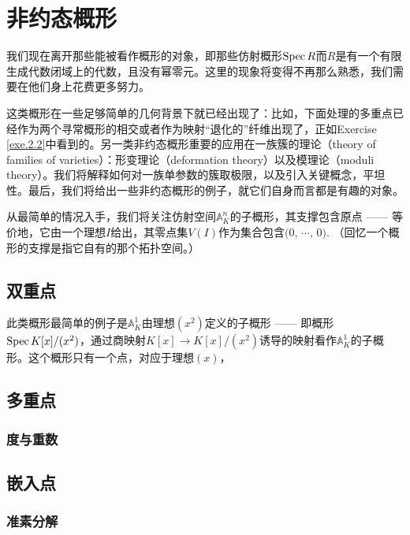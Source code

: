 \section{非约态概形}

我们现在离开那些能被看作概形的对象，即那些仿射概形$\operatorname{Spec} R$而$R$是有一个有限生成代数闭域上的代数，且没有幂零元。这里的现象将变得不再那么熟悉，我们需要在他们身上花费更多努力。

这类概形在一些足够简单的几何背景下就已经出现了：比如，下面处理的多重点已经作为两个寻常概形的相交或者作为映射“退化的”纤维出现了，正如Exercise \ref{exe.2.2}中看到的。另一类非约态概形重要的应用在一族簇的理论（theory of families of varieties）：形变理论（deformation theory）以及模理论（moduli theory）。我们将解释如何对一族单参数的簇取极限，以及引入关键概念，平坦性。最后，我们将给出一些非约态概形的例子，就它们自身而言都是有趣的对象。

从最简单的情况入手，我们将关注仿射空间$\mathbb{A}_K^n$的子概形，其支撑包含原点 ------ 等价地，它由一个理想$I$给出，其零点集$V(I)$作为集合包含$(0$, $\cdots$, $0)$. （回忆一个概形的支撑是指它自有的那个拓扑空间。）

\subsection{双重点}

\begin{exa}
	此类概形最简单的例子是$\mathbb{A}_K^1$由理想$(x^2)$定义的子概形 ------ 即概形$\operatorname{Spec} K[x]/(x^2)$，通过商映射$K[x]\to K[x]/(x^2)$诱导的映射看作$\mathbb{A}_K^1$的子概形。这个概形只有一个点，对应于理想$(x)$，
\end{exa}

\subsection{多重点}

\subsubsection*{度与重数}

\subsection{嵌入点}

\subsubsection*{准素分解}

